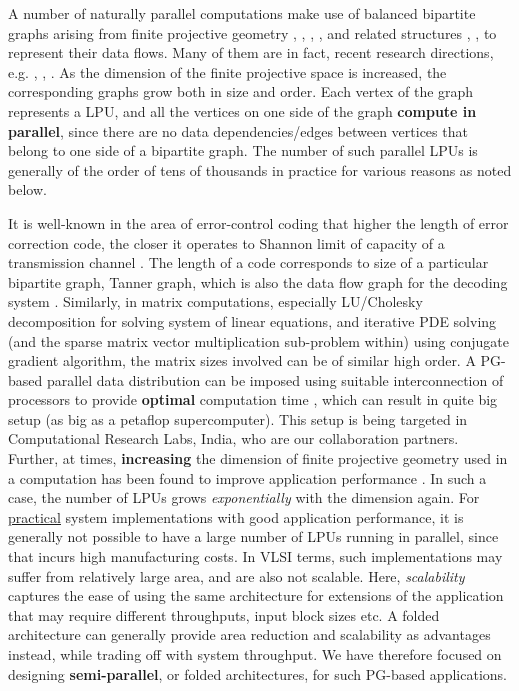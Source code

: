 \documentclass[12pt]{article}
\begin{document}
A number of naturally parallel computations make use of balanced bipartite
graphs arising from finite projective geometry \cite{hoholdt},
\cite{expanders}, \cite{mat_pap}, \cite{fossorier}, and related
structures \cite{rakov1}, \cite{rakov2}, \cite{nschau} to
represent their data flows. Many of them are in fact, recent
research directions, e.g. \cite{hoholdt}, \cite{rakov1},
\cite{fossorier}. As the dimension of the
finite projective space is increased, the corresponding graphs grow both in size
and order. Each vertex of the graph represents a LPU, and all
the vertices on one side of the graph \textbf{compute in parallel}, since there
are no data dependencies/edges between vertices that belong to one side of
a bipartite graph.  The number of such parallel LPUs is
generally of the order of tens of thousands in practice for various
reasons as noted below.

It is well-known in the area of error-control coding that higher the length
of error correction code, the closer it operates to Shannon limit of
capacity of a transmission channel \cite{fossorier}. The length of a code
corresponds to size of a particular bipartite graph, Tanner graph, which is
also the data flow graph for the decoding system \cite{fossorier}.
Similarly, in matrix computations, especially LU/Cholesky decomposition for
solving system of linear equations, and iterative PDE solving (and the
sparse matrix vector multiplication sub-problem within) using conjugate
gradient algorithm, the matrix sizes involved can be of similar high order.
A PG-based parallel data distribution can be imposed using suitable
interconnection of processors to provide \textbf{optimal} computation time
\cite{mat_pap}, which can result in quite big setup (as big as a petaflop
supercomputer).  This setup is being targeted in Computational Research
Labs, India, who are our collaboration partners. Further, at times,
\textbf{increasing} the dimension of finite projective geometry used in a
computation has been found to improve application performance
\cite{expanders}. In such a case, the number of LPUs grows
\textit{exponentially} with the dimension again. For \uline{practical} system
implementations with good application performance, it is
generally not possible to
have a large number of LPUs running in parallel, since that
incurs high manufacturing costs. In VLSI terms, such implementations may
suffer from relatively large area, and are also not scalable. Here,
\textit{scalability} captures the ease of using the same architecture for
extensions of the application that may require different throughputs, input
block sizes etc. A folded architecture can generally provide area reduction
and scalability as advantages instead, while trading off with system
throughput. We have therefore focused on designing \textbf{semi-parallel},
or folded architectures, for such PG-based applications.
\end{document}
